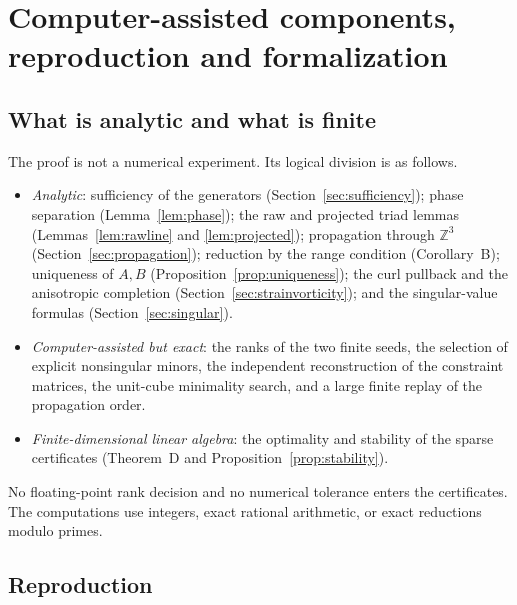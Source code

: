 \documentclass[11pt]{article}
\theoremstyle{definition}
\theoremstyle{remark}
\theoremstyle{plain}
\newcommand{\Z}{\mathbb{Z}}
\begin{document}
\section{Computer-assisted components, reproduction and formalization}
\label{sec:computer}

\subsection{What is analytic and what is finite}
\label{subsec:split}

The proof is not a numerical experiment. Its logical division is as follows.
\begin{itemize}
\item \emph{Analytic}: sufficiency of the generators
(Section~\ref{sec:sufficiency}); phase separation (Lemma~\ref{lem:phase}); the
raw and projected triad lemmas (Lemmas~\ref{lem:rawline} and
\ref{lem:projected}); propagation through $\Z^{3}$
(Section~\ref{sec:propagation}); reduction by the range condition
(Corollary~B); uniqueness of $A,B$ (Proposition~\ref{prop:uniqueness}); the
curl pullback and the anisotropic completion
(Section~\ref{sec:strainvorticity}); and the singular-value formulas
(Section~\ref{sec:singular}).
\item \emph{Computer-assisted but exact}: the ranks of the two finite seeds,
the selection of explicit nonsingular minors, the independent reconstruction
of the constraint matrices, the unit-cube minimality search, and a large finite
replay of the propagation order.
\item \emph{Finite-dimensional linear algebra}: the optimality and stability of
the sparse certificates (Theorem~D and
Proposition~\ref{prop:stability}).
\end{itemize}
No floating-point rank decision and no numerical tolerance enters the
certificates. The computations use integers, exact rational arithmetic, or
exact reductions modulo primes.

\subsection{Reproduction}
\label{subsec:repro}
\end{document}
